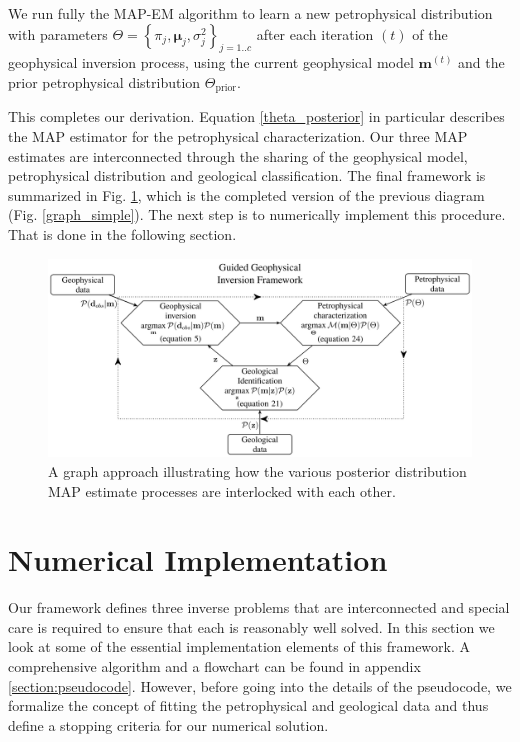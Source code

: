 \documentclass[extra]{gji} %
\begin{document}
We run fully the MAP-EM algorithm to learn a new petrophysical distribution with parameters $\Theta = \left\{\pi_j, \mathbf{\mu}_j, \sigma_j^2\right\}_{j=1..c}$ after each iteration $(t)$ of the geophysical inversion process, using the current geophysical model $\mathbf{m}^{(t)}$ and the prior petrophysical distribution $\Theta_{\text{prior}}$.

This completes our derivation. Equation \ref{theta_posterior} in particular describes the MAP estimator for the petrophysical characterization. Our three MAP estimates are interconnected through the sharing of the geophysical model, petrophysical distribution and geological classification. The final framework is summarized in Fig. \ref{graph_math}, which is the completed version of the previous diagram (Fig. \ref{graph_simple}). The next step is to numerically implement this procedure. That is done in the following section.

\begin{figure}
    \includegraphics[width=\columnwidth]{./Fig/LowRes/Framework_with_equationsnumbers.png}
    \caption{A graph approach illustrating how the various posterior distribution MAP estimate processes are interlocked with each other.}
    \label{graph_math}
\end{figure}

\section{Numerical Implementation} \label{section:Implementation}

Our framework defines three inverse problems that are interconnected and special care is required to ensure that each is reasonably well solved. In this section we look at some of the essential implementation elements of this framework. A comprehensive algorithm and a flowchart can be found in appendix \ref{section:pseudocode}. However, before going into the details of the pseudocode, we formalize the concept of fitting the petrophysical and geological data and thus define a stopping criteria for our numerical solution.
\end{document}
